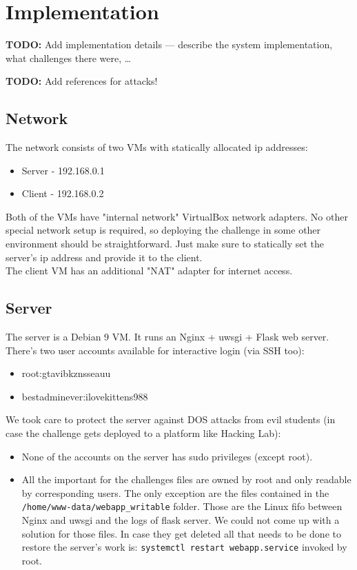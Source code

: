 \documentclass[a4paper]{article}
\newcommand{\TODO}[1]{\begin{center}\large\textbf{TODO:} #1\end{center}}
\begin{document}
\section{Implementation}

\TODO{Add implementation details --- describe the system implementation, what challenges there were, \ldots}
\TODO{Add references for attacks!}

\subsection{Network}
  The network consists of two VMs with statically allocated ip addresses:
  \begin{itemize}
    \item Server - 192.168.0.1
    \item Client - 192.168.0.2
  \end{itemize}
  Both of the VMs have "internal network" VirtualBox network adapters. No other
  special network setup is required, so deploying the challenge in some other
  environment should be straightforward. Just make sure to statically set the
  server's ip address and provide it to the client. \\


  The client VM  has an additional "NAT" adapter for internet access.
\subsection{Server}
  The server is a Debian 9 VM. It runs an Nginx + uwsgi + Flask web server.
  There's two user accounts available for interactive login (via SSH too):
  \begin{itemize}
    \item root:gtavibkznsseauu
    \item bestadminever:ilovekittens988
  \end{itemize}

  We took care to protect the server against DOS attacks from evil students (in
  case the challenge gets deployed to a platform like Hacking Lab):
  \begin{itemize}
    \item None of the accounts on the server has sudo privileges (except root).
    \item All the important for the challenges files are owned by root and only
      readable by corresponding users. The only exception are the files contained
      in the \texttt{/home/www-data/webapp\_writable} folder. Those are the
      Linux fifo between Nginx and uwsgi and the logs of flask server. We could
      not come up with a solution for those files. In case they get deleted
      all that needs to be done to restore the server's work is:
      \texttt{systemctl restart webapp.service} invoked by root.
  \end{itemize}
\end{document}
